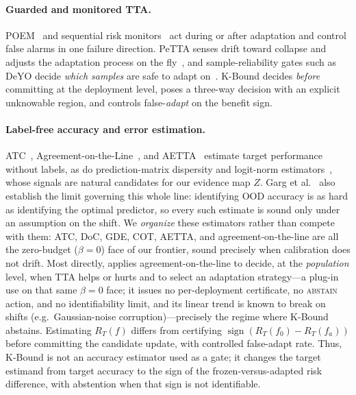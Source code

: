 \documentclass[conference]{IEEEtran}
\theoremstyle{plain}
\theoremstyle{definition}
\theoremstyle{remark}
\newcommand{\sign}{\operatorname{sign}}
\begin{document}
\paragraph{Guarded and monitored TTA.}
POEM~\cite{bar2024poem} and sequential risk monitors~\cite{schirmer2025monitoring,podkopaev2022tracking}
act during or after adaptation and control false alarms in one failure direction. PeTTA senses
drift toward collapse and adjusts the adaptation process on the fly~\cite{hoang2024petta}, and
sample-reliability gates such as DeYO decide \emph{which samples} are safe to adapt
on~\cite{lee2024deyo}. K-Bound decides \emph{before} committing at the deployment level, poses a
three-way decision with an explicit unknowable region, and controls false-\emph{adapt} on the
benefit sign.

\paragraph{Label-free accuracy and error estimation.}
ATC~\cite{garg2022atc}, Agreement-on-the-Line~\cite{baek2022aol,miller2021aol}, and
AETTA~\cite{lee2024aetta} estimate target performance without labels, as do prediction-matrix
dispersity and logit-norm estimators~\cite{deng2023confidence,xie2024mano}, whose signals are
natural candidates for our evidence map $Z$. Garg et al.~\cite{garg2022atc} also establish the
limit governing this whole line: identifying OOD accuracy is as hard as identifying the optimal
predictor, so every such estimate is sound only under an assumption on the shift. We \emph{organize} these estimators rather than compete with
them: ATC, DoC, GDE, COT, AETTA, and agreement-on-the-line are all the zero-budget
($\beta{=}0$) face of our frontier, sound precisely when calibration does not drift. Most
directly, \cite{kim2024taol} applies agreement-on-the-line to decide, at the \emph{population}
level, when TTA helps or hurts and to select an adaptation strategy---a plug-in use on that same
$\beta{=}0$ face; it issues no per-deployment certificate, no \textsc{abstain} action, and no
identifiability limit, and its linear trend is known to break on shifts (e.g.\ Gaussian-noise
corruption)---precisely the regime where K-Bound abstains. Estimating
$R_T(f)$ differs from certifying $\sign(R_T(f_0)-R_T(f_a))$ before committing the candidate update,
with controlled false-adapt rate. Thus, K-Bound is not an accuracy estimator used as a gate; it
changes the target estimand from target accuracy to the sign of the frozen-versus-adapted
risk difference, with abstention when that sign is not identifiable.
\end{document}
